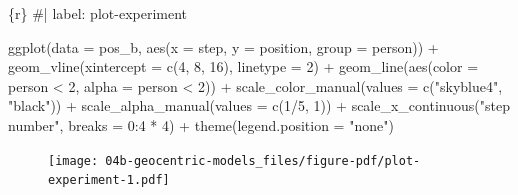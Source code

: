\documentclass[
  letterpaper,
  DIV=11,
  numbers=noendperiod]{scrreprt}
\newenvironment{Shaded}{\begin{snugshade}}{\end{snugshade}}
\newcommand{\AttributeTok}[1]{\textcolor[rgb]{0.40,0.45,0.13}{#1}}
\newcommand{\CommentTok}[1]{\textcolor[rgb]{0.37,0.37,0.37}{#1}}
\newcommand{\DecValTok}[1]{\textcolor[rgb]{0.68,0.00,0.00}{#1}}
\newcommand{\FunctionTok}[1]{\textcolor[rgb]{0.28,0.35,0.67}{#1}}
\newcommand{\InformationTok}[1]{\textcolor[rgb]{0.37,0.37,0.37}{#1}}
\newcommand{\NormalTok}[1]{\textcolor[rgb]{0.00,0.23,0.31}{#1}}
\newcommand{\SpecialCharTok}[1]{\textcolor[rgb]{0.37,0.37,0.37}{#1}}
\newcommand{\StringTok}[1]{\textcolor[rgb]{0.13,0.47,0.30}{#1}}
\begin{document}
\begin{Shaded}
\begin{Highlighting}[]
\InformationTok{\textasciigrave{}\textasciigrave{}\textasciigrave{}\{r\}}
\CommentTok{\#| label: plot{-}experiment}

\FunctionTok{ggplot}\NormalTok{(}\AttributeTok{data =}\NormalTok{ pos\_b, }
       \FunctionTok{aes}\NormalTok{(}\AttributeTok{x =}\NormalTok{ step, }\AttributeTok{y =}\NormalTok{ position, }\AttributeTok{group =}\NormalTok{ person)) }\SpecialCharTok{+}
  \FunctionTok{geom\_vline}\NormalTok{(}\AttributeTok{xintercept =} \FunctionTok{c}\NormalTok{(}\DecValTok{4}\NormalTok{, }\DecValTok{8}\NormalTok{, }\DecValTok{16}\NormalTok{), }\AttributeTok{linetype =} \DecValTok{2}\NormalTok{) }\SpecialCharTok{+}
  \FunctionTok{geom\_line}\NormalTok{(}\FunctionTok{aes}\NormalTok{(}\AttributeTok{color =}\NormalTok{ person }\SpecialCharTok{\textless{}} \DecValTok{2}\NormalTok{, }\AttributeTok{alpha  =}\NormalTok{ person }\SpecialCharTok{\textless{}} \DecValTok{2}\NormalTok{)) }\SpecialCharTok{+}
  \FunctionTok{scale\_color\_manual}\NormalTok{(}\AttributeTok{values =} \FunctionTok{c}\NormalTok{(}\StringTok{"skyblue4"}\NormalTok{, }\StringTok{"black"}\NormalTok{)) }\SpecialCharTok{+}
  \FunctionTok{scale\_alpha\_manual}\NormalTok{(}\AttributeTok{values =} \FunctionTok{c}\NormalTok{(}\DecValTok{1}\SpecialCharTok{/}\DecValTok{5}\NormalTok{, }\DecValTok{1}\NormalTok{)) }\SpecialCharTok{+}
  \FunctionTok{scale\_x\_continuous}\NormalTok{(}\StringTok{"step number"}\NormalTok{, }\AttributeTok{breaks =} \DecValTok{0}\SpecialCharTok{:}\DecValTok{4} \SpecialCharTok{*} \DecValTok{4}\NormalTok{) }\SpecialCharTok{+}
  \FunctionTok{theme}\NormalTok{(}\AttributeTok{legend.position =} \StringTok{"none"}\NormalTok{)}
\InformationTok{\textasciigrave{}\textasciigrave{}\textasciigrave{}}
\end{Highlighting}
\end{Shaded}

\begin{figure}[H]

{\centering \texttt{[image: 04b-geocentric-models\_files/figure-pdf/plot-experiment-1.pdf]}

}

\end{figure}
\end{document}
